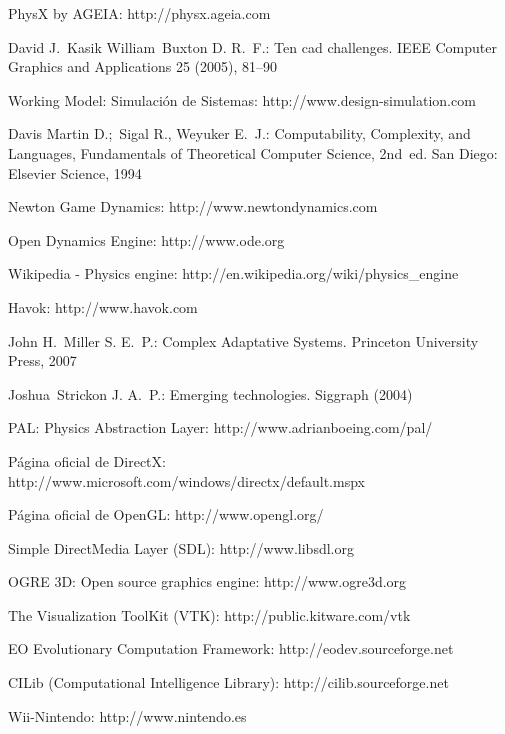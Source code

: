 \documentclass[runningheads]{llncs}
\begin{document}
\begin{thebibliography}{0}

PhysX by AGEIA:
http://physx.ageia.com

David J.~Kasik William~Buxton D. R.~F.:
Ten cad challenges.
IEEE Computer Graphics and Applications 25 (2005), 81--90

Working Model: Simulaci\'on de Sistemas:
http://www.design-simulation.com

Davis Martin D.;~Sigal R., Weyuker E.~J.:
Computability, Complexity, and Languages, Fundamentals of Theoretical Computer
Science, 2nd~ed.
San Diego: Elsevier Science, 1994

Newton Game Dynamics:
http://www.newtondynamics.com

Open Dynamics Engine:
http://www.ode.org

Wikipedia - Physics engine:
http://en.wikipedia.org/wiki/physics\_engine

Havok:
http://www.havok.com

John H.~Miller S. E.~P.:
Complex Adaptative Systems.
Princeton University Press, 2007

Joshua~Strickon J. A.~P.:
Emerging technologies.
Siggraph (2004)

PAL: Physics Abstraction Layer:
http://www.adrianboeing.com/pal/

Página oficial de DirectX:
http://www.microsoft.com/windows/directx/default.mspx

Página oficial de OpenGL:
http://www.opengl.org/

Simple DirectMedia Layer (SDL):
http://www.libsdl.org

OGRE 3D: Open source graphics engine:
http://www.ogre3d.org

The Visualization ToolKit (VTK):
http://public.kitware.com/vtk

EO Evolutionary Computation Framework:
http://eodev.sourceforge.net

CILib (Computational Intelligence Library):
http://cilib.sourceforge.net

Wii-Nintendo:
http://www.nintendo.es


\end{thebibliography}
\end{document}

